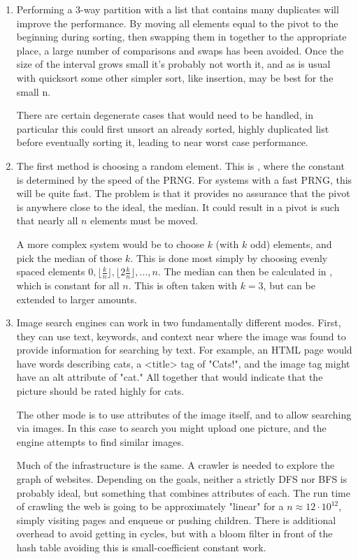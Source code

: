 \documentclass[12pt]{chmullighw}
\begin{document}
\begin{enumerate}
\item Performing a 3-way partition with a list that contains many duplicates will improve the performance. By moving all elements equal to the pivot to the beginning during sorting, then swapping them in together to the appropriate place, a large number of comparisons and swaps has been avoided. Once the size of the interval grows small it's probably not worth it, and as is usual with quicksort some other simpler sort, like insertion, may be best for the small n.

There are certain degenerate cases that would need to be handled, in particular this could first unsort an already sorted, highly duplicated list before eventually sorting it, leading to near worst case performance.


\item The first method is choosing a random element. This is , where the constant is determined by the speed of the PRNG. For systems with a fast PRNG, this will be quite fast. The problem is that it provides no assurance that the pivot is anywhere close to the ideal, the median. It could result in a pivot is such that nearly all $n$ elements must be moved.

A more complex system would be to choose $k$ (with $k$ odd) elements, and pick the median of those $k$. This is done most simply by choosing evenly spaced elements $0, \lfloor\frac{k}{n}\rfloor, \lfloor2\frac{k}{n}\rfloor, ..., n$. The median can then be calculated in , which is constant for all $n$. This is often taken with $k = 3$, but can be extended to larger amounts.


\item Image search engines can work in two fundamentally different modes. First, they can use text, keywords, and context near where the image was found to provide information for searching by text. For example, an HTML page would have words describing cats, a <title> tag of "Cats!", and the image tag might have an alt attribute of "cat." All together that would indicate that the picture should be rated highly for cats.

The other mode is to use attributes of the image itself, and to allow searching via images. In this case to search you might upload one picture, and the engine attempts to find similar images.

Much of the infrastructure is the same. A crawler is needed to explore the graph of websites. Depending on the goals, neither a strictly DFS nor BFS is probably ideal, but something that combines attributes of each. The run time of crawling the web is going to be approximately "linear" for a $n \approx 12\cdot10^{12}$, simply visiting pages and enqueue or pushing children. There is additional overhead to avoid getting in cycles, but with a bloom filter in front of the hash table avoiding this is small-coefficient constant work. 


\end{enumerate}
\end{document}
